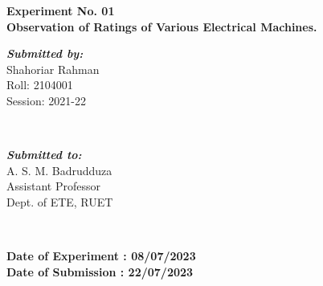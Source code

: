 \begin{titlepage}
\begin{center}
    \textbf{\Large  Experiment No. 01}
    \\[.25cm]
    \textbf{\large Observation of Ratings of Various Electrical Machines.}
    \\
    \myrule[1pt][5pt]
    \begin{minipage}{0.4\textwidth}
      \vspace{0.5cm}
      \begin{flushleft}
        \emph{\textbf{\large Submitted by:}}
        \\
        Shahoriar Rahman \\
        Roll: 2104001 \\
        Session: 2021-22
      \end{flushleft}
    \end{minipage}
    ~
    \begin{minipage}{0.4\textwidth}
      \vspace{0.5cm}
      \begin{flushright}
        \emph{\textbf{\large Submitted to:}}
        \\
        A. S. M. Badrudduza
        \\
        Assistant Professor
        \\
        Dept. of ETE, RUET
        \\
      \end{flushright}
    \end{minipage}\\[0.7cm]
    \makeatother

    \textbf{Date of Experiment : 08/07/2023}\\
    \textbf{Date of Submission : 22/07/2023}\\[1cm]




\end{center}
\end{titlepage}
